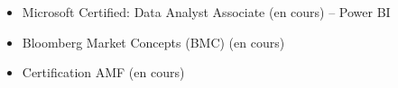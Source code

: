 \begin{itemize}
    \item Microsoft Certified: Data Analyst Associate (en cours) -- Power BI
    \item Bloomberg Market Concepts (BMC) (en cours)
    \item Certification AMF (en cours)
\end{itemize}
